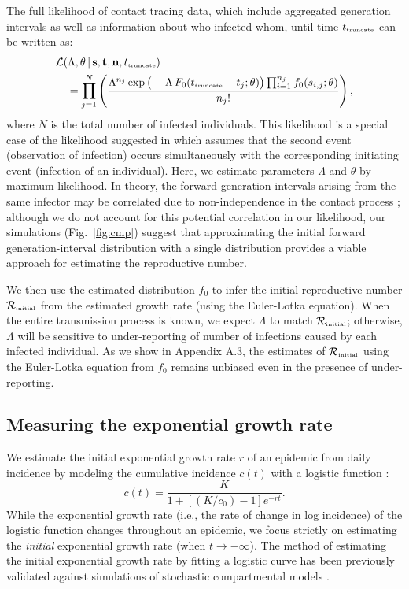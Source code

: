 \documentclass[12pt]{article}
\newcommand{\fref}[1]{Fig.~\ref{fig:#1}}
\newcommand{\Rx}[1]{\ensuremath{{\mathcal R}_{#1}}\xspace}
\newcommand{\Rini}{\Rx{\textrm{\tiny initial}}}
\newcommand{\tsub}[2]{#1_{{\textrm{\tiny #2}}}}
\begin{document}
The full likelihood of contact tracing data, which include aggregated generation intervals as well as information about who infected whom, until time $\tsub{t}{truncate}$ can be written as:
\begin{equation}\label{eq:nonhomogeneous}
\begin{aligned}
&\mathcal{L}(\Lambda, \theta\,|\, \mathbf{s}, \mathbf{t}, \mathbf{n}, \tsub{t}{truncate})\\
&\quad=\prod_{j=1}^N \left(\frac{\Lambda^{n_j} \exp \big(- \Lambda\, F_0(\tsub{t}{truncate} - t_j ;\theta) \big) \prod_{i=1}^{n_j} f_0(s_{i, j}; \theta)}{n_j!} \right),
\end{aligned}
\end{equation}
where $N$ is the total number of infected individuals.
This likelihood is a special case of the likelihood suggested in \citep{kalbfleisch1989inference} which assumes that the second event (observation of infection) occurs simultaneously with the corresponding initiating event (infection of an individual).
Here, we estimate parameters $\Lambda$ and $\theta$ by maximum likelihood.
In theory, the forward generation intervals arising from the same infector may be correlated due to non-independence in the contact process \citep{yan2008separate}; although we do not account for this potential correlation in our likelihood, our simulations (\fref{cmp}) suggest that approximating the initial forward generation-interval distribution with a single distribution provides a viable approach for estimating the reproductive number.

We then use the estimated distribution $f_0$ to infer the initial reproductive number $\Rini$ from the estimated growth rate (using the Euler-Lotka equation).
When the entire transmission process is known, we expect $\Lambda$ to match $\Rini$;
otherwise, $\Lambda$ will be sensitive to under-reporting of number of infections caused by each infected individual.
As we show in Appendix A.3, the estimates of $\Rini$ using the Euler-Lotka equation from $f_0$ remains unbiased even in the presence of under-reporting.

\subsection{Measuring the exponential growth rate}

We estimate the initial exponential growth rate $r$ of an epidemic from daily incidence by modeling the cumulative incidence $c(t)$ with a logistic function \citep{ma2014estimating}:
\begin{equation}
c(t) = \frac{K}{1 + \left[(K/c_0)-1\right]e^{-rt}}.
\end{equation}
While the exponential growth rate (i.e., the rate of change in log incidence) of the logistic function changes throughout an epidemic,
we focus strictly on estimating the \emph{initial} exponential growth rate (when $t \to -\infty$).
The method of estimating the initial exponential growth rate by fitting a logistic curve has been previously validated against simulations of stochastic compartmental models \citep{ma2014estimating}.
\end{document}
